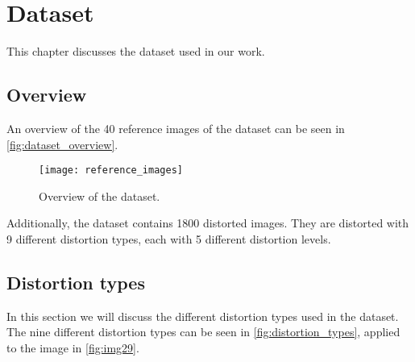 \chapter{Dataset}
\label{ch:dataset}
This chapter discusses the dataset used in our work.

\section{Overview}
\label{sec:dataset_overview}
An overview of the 40 reference images of the dataset can be seen in \autoref{fig:dataset_overview}.

\begin{figure}[h]
    \centering
    \texttt{[image: reference\_images]}
    \caption{Overview of the dataset.}
    \label{fig:dataset_overview}
\end{figure}

Additionally, the dataset contains 1800 distorted images.
They are distorted with 9 different distortion types, each with 5 different distortion levels.

\section{Distortion types}
\label{sec:dataset_distortion_types}

In this section we will discuss the different distortion types used in the dataset.
The nine different distortion types can be seen in \autoref{fig:distortion_types}, applied to the image in \autoref{fig:img29}.

